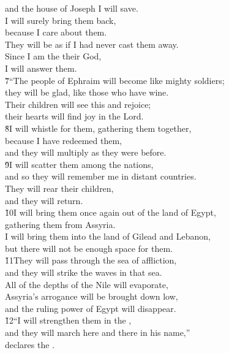 \begin{poetry}
\poemll    and the house of Joseph I will save. \\
\poeml I will surely bring them back, \\
\poemll    because I care about them. \\
\poeml They will be as if I had never cast them away. \\
\poemll    Since I am the  their God, \\
\poemlll       I will answer them. \\
\poeml \v{7}``The people of Ephraim will become like mighty soldiers; \\
\poemll    they will be glad, like those who have wine. \\
\poeml Their children will see this and rejoice; \\
\poemll    their hearts will find joy in the Lord. \\
\poeml \v{8}I will whistle for them, gathering them together, \\
\poemll    because I have redeemed them, \\
\poemlll       and they will multiply as they were before. \\
\poeml \v{9}I will scatter them among the nations, \\
\poemll    and so they will remember me in distant countries. \\
\poeml They will rear their children, \\
\poemll    and they will return. \\
\poeml \v{10}I will bring them once again out of the land of Egypt, \\
\poemll    gathering them from Assyria. \\
\poeml I will bring them into the land of Gilead and Lebanon, \\
\poemll    but there will not be enough space for them. \\
\poeml \v{11}They will pass through the sea of affliction, \\
\poemll    and they will strike the waves in that sea. \\
\poeml All of the depths of the Nile will evaporate, \\
\poemll    Assyria's arrogance will be brought down low, \\
\poemlll       and the ruling power of Egypt will disappear. \\
\poeml \v{12}``I will strengthen them in the , \\
\poemll    and they will march here and there in his name,'' \\
\poemlll       declares the .
\end{poetry}

